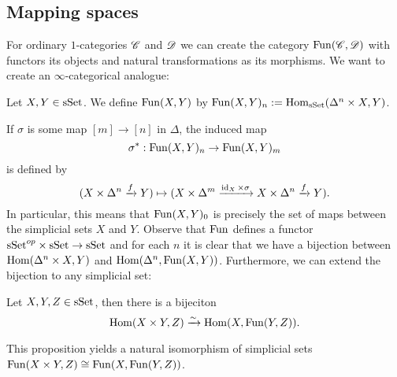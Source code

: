 \documentclass[../../thesis.tex]{subfiles}
\begin{document}
\subsection{Mapping spaces}
For ordinary $1$-categories $\mathscr{C}$ and $\mathscr{D}$ we can create the category $\mathrm{Fun}(\mathscr{C}, \mathscr{D})$ with functors its objects and natural transformations as its morphisms.
We want to create an $\infty$-categorical analogue:
\begin{definition}
    Let $X, Y \in \mathrm{sSet}$.
    We define $\mathrm{Fun}(X,Y)$ by $\mathrm{Fun}(X,Y)_n : = \mathrm{Hom}_{\mathrm{sSet}}(\Delta^n \times X, Y)$.
\end{definition}
If $\sigma$ is some map $[m] \to [n]$ in $\Delta$, the induced map
\[
    \sigma^* : \mathrm{Fun}(X,Y)_n \to \mathrm{Fun}(X,Y)_m
\]
is defined by
\[
    (X \times \Delta^n \xrightarrow{f} Y) \mapsto (X \times \Delta^m \xrightarrow{\operatorname{id}_X \times \sigma}X \times \Delta^n \xrightarrow{f} Y).
\]
In particular, this means that $\mathrm{Fun}(X,Y)_0$ is precisely the set of maps between the simplicial sets $X$ and $Y$.
Observe that $\mathrm{Fun}$ defines a functor $\mathrm{sSet}^{op}\times \mathrm{sSet} \to \mathrm{sSet}$ and for each $n$ it is clear that we have a bijection between $\mathrm{Hom}(\Delta^n \times X, Y)$ and $\mathrm{Hom}(\Delta^n, \mathrm{Fun}(X,Y))$.
Furthermore, we can extend the bijection to any simplicial set:
\begin{proposition}
    Let $X,Y,Z \in \mathrm{sSet}$, then there is a bijeciton
    \[
        \mathrm{Hom}(X\times Y, Z) \xrightarrow{\sim} \mathrm{Hom}(X, \mathrm{Fun}(Y,Z)).
    \]
\end{proposition}
This proposition yields a natural isomorphism of simplicial sets $\mathrm{Fun}(X\times Y, Z) \cong \mathrm{Fun}(X, \mathrm{Fun}(Y,Z))$.
\end{document}
